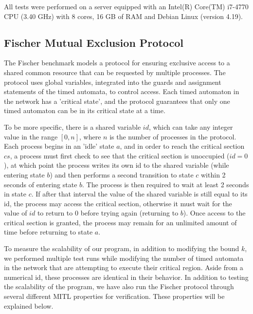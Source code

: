 \documentclass[a4paper,12pt]{article}
\begin{document}
All tests were performed on a server equipped with an Intel(R) Core(TM) i7-4770
CPU (3.40 GHz) with 8 cores, 16 GB of RAM and Debian Linux (version 4.19).



\subsection{Fischer Mutual Exclusion Protocol}\label{evaluation-fischer}
The Fischer benchmark models a protocol for ensuring exclusive access to a
shared common resource that can be requested by multiple processes. The protocol
uses global variables, integrated into the guards and assignment statements of
the timed automata, to control access. Each timed automaton in the network has a
'critical state', and the protocol guarantees that only one timed automaton can
be in its critical state at a time.

To be more specific, there is a shared variable \(id\), which can take any
integer value in the range \([0,n]\), where \(n\) is the number of processes in the
protocol. Each process begins in an 'idle' state \(a\), and in order to reach the
critical section \(cs\), a process must first check to see that the critical
section is unoccupied (\(id=0\)), at which point the process writes its own id to
the shared variable (while entering state \(b\)) and then performs a second
transition to state \(c\) within 2 seconds of entering state \(b\). The process is
then required to wait at least 2 seconds in state \(c\). If after that interval
the value of the shared variable is still equal to its id, the process may access
the critical section, otherwise it must wait for the value of \(id\) to return
to \(0\) before trying again (returning to \(b\)). Once access to the critical
section is granted, the process may remain for an unlimited amount of time before
returning to state \(a\).

To measure the scalability of our program, in addition to modifying the bound
\(k\), we performed multiple test runs while modifying the number of timed
automata in the network that are attempting to execute their critical region.
Aside from a numerical id, these processes are identical in their behavior.
In addition to testing the scalability of the program, we have also run the
Fischer protocol through several different MITL properties for verification.
These properties will be explained below.
\end{document}

